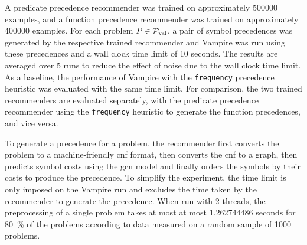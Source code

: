 A predicate precedence recommender was trained on approximately \num{500000} examples,
and a function precedence recommender was trained on approximately \num{400000} examples.
For each problem $P \in \operatorname{\mathcal{P}_{\mathrm{val}}}$,
a pair
 of symbol precedences was generated by the respective trained recommender
and Vampire was run using these precedences and a wall clock time limit of 10 seconds.
The results are averaged over 5 runs to reduce the effect of noise due to the wall clock time limit.
As a baseline, the performance of Vampire with the \texttt{frequency} precedence heuristic was evaluated
with the same time limit.
For comparison, the two trained recommenders are evaluated separately,
with the predicate precedence recommender using the \texttt{frequency} heuristic to generate the function precedences, and vice versa.

To generate a precedence for a problem,
the recommender first converts the problem to a machine-friendly \gls{cnf} format,
then converts the \gls{cnf} to a graph,
then predicts symbol costs using the \gls{gcn} model
and finally orders the symbols by their costs to produce the precedence.
To simplify the experiment, the time limit is only imposed on the Vampire run
and excludes the time taken by the recommender to generate the precedence.
When run with 2 threads,
the preprocessing of a single problem
takes at most at most \num[round-mode=places,round-precision=2]{1.262744486} seconds
for \SI{80}{\percent} of the problems
according to data measured on a random sample of \num{1000} problems.

